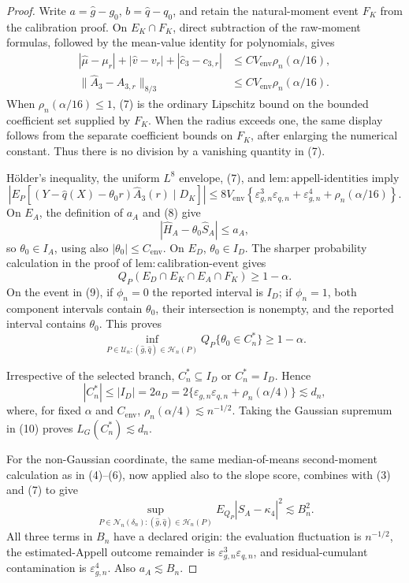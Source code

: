 \documentclass{article}
\begin{document}
\begin{proof}
Write \(a=\widehat g-g_0\), \(b=\widehat q-q_0\), and retain the natural-moment event \(F_K\) from the calibration proof.  On \(E_K\cap F_K\), direct subtraction of the raw-moment formulas, followed by the mean-value identity for polynomials, gives
\[
\begin{aligned}
|\widehat\mu-\mu_r|+|\widehat v-v_r|+|\widehat c_3-c_{3,r}|
&\le C V_{\mathrm{env}}\rho_n(\alpha/16),\\
\lVert\widehat A_3-A_{3,r}\rVert_{8/3}
&\le C V_{\mathrm{env}}\rho_n(\alpha/16).
\end{aligned}
\tag{7}
\]
When \(\rho_n(\alpha/16)\le1\), (7) is the ordinary Lipschitz bound on the bounded coefficient set supplied by \(F_K\).  When the radius exceeds one, the same display follows from the separate coefficient bounds on \(F_K\), after enlarging the numerical constant.  Thus there is no division by a vanishing quantity in (7).

H\"older's inequality, the uniform \(L^8\) envelope, (7), and \(\mathrm{lem:appell\mbox{-}identities}\) imply
\[
\left|E_P[(Y-\widehat q(X)-\theta_0r)\widehat A_3(r)\mid D_K]\right|
\le8V_{\mathrm{env}}\left\{
\varepsilon_{g,n}^3\varepsilon_{q,n}+\varepsilon_{g,n}^4
+\rho_n(\alpha/16)\right\}.
\tag{8}
\]
On \(E_A\), the definition of \(a_A\) and (8) give
\[
|\widehat H_A-\theta_0\widehat S_A|\le a_A,
\]
so \(\theta_0\in I_A\), using also \(|\theta_0|\le C_{\mathrm{env}}\).  On \(E_D\), \(\theta_0\in I_D\).  The sharper probability calculation in the proof of \(\mathrm{lem:calibration\mbox{-}event}\) gives
\[
Q_P(E_D\cap E_K\cap E_A\cap F_K)\ge1-\alpha.
\tag{9}
\]
On the event in (9), if \(\phi_n=0\) the reported interval is \(I_D\); if \(\phi_n=1\), both component intervals contain \(\theta_0\), their intersection is nonempty, and the reported interval contains \(\theta_0\).  This proves
\[
\inf_{P\in\mathcal U_n:(\widehat g,\widehat q)\in\mathcal H_n(P)}
Q_P\{\theta_0\in C_n^*\}\ge1-\alpha.
\]

Irrespective of the selected branch, \(C_n^*\subseteq I_D\) or \(C_n^*=I_D\).  Hence
\[
|C_n^*|\le|I_D|=2a_D
=2\{\varepsilon_{g,n}\varepsilon_{q,n}+\rho_n(\alpha/4)\}
\lesssim d_n,
\tag{10}
\]
where, for fixed \(\alpha\) and \(C_{\mathrm{env}}\), \(\rho_n(\alpha/4)\lesssim n^{-1/2}\).  Taking the Gaussian supremum in (10) proves \(L_G(C_n^*)\lesssim d_n\).

For the non-Gaussian coordinate, the same median-of-means second-moment calculation as in (4)--(6), now applied also to the slope score, combines with (3) and (7) to give
\[
\sup_{P\in\mathcal N_n(\delta_n):(\widehat g,\widehat q)\in\mathcal H_n(P)}
E_{Q_P}|\widehat S_A-\kappa_4|^2\lesssim B_n^2.
\tag{11}
\]
All three terms in \(B_n\) have a declared origin: the evaluation fluctuation is \(n^{-1/2}\), the estimated-Appell outcome remainder is \(\varepsilon_{g,n}^3\varepsilon_{q,n}\), and residual-cumulant contamination is \(\varepsilon_{g,n}^4\).  Also \(a_A\lesssim B_n\).


\end{proof}
\end{document}
